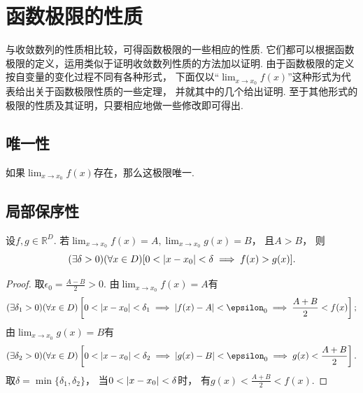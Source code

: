 \section{函数极限的性质}
与收敛数列的性质相比较，可得函数极限的一些相应的性质.
它们都可以根据函数极限的定义，运用类似于证明收敛数列性质的方法加以证明.
由于函数极限的定义按自变量的变化过程不同有各种形式，
下面仅以“\(\lim_{x \to x_0}f(x)\)”这种形式为代表给出关于函数极限性质的一些定理，
并就其中的几个给出证明.
至于其他形式的极限的性质及其证明，只要相应地做一些修改即可得出.

\subsection{唯一性}
\begin{theorem}[唯一性]\label{theorem:极限.函数极限的唯一性}
如果\(\lim_{x \to x_0} f(x)\)存在，那么这极限唯一.
\end{theorem}

\subsection{局部保序性}
\begin{theorem}[局部保序性]\label{theorem:极限.函数极限的局部保序性1}
设\(f,g\in\mathbb{R}^D\).
若\(\lim_{x\to x_0} f(x) = A,
\lim_{x\to x_0} g(x) = B\)，
且\(A>B\)，
则\begin{equation*}
	(\exists\delta>0)
	(\forall x\in D)
	[0<\abs{x-x_0}<\delta \implies f(x)>g(x)].
\end{equation*}
\begin{proof}
取\(\epsilon_0=\frac{A-B}2>0\).
由\(\lim_{x\to x_0} f(x) = A\)有\begin{equation*}
	(\exists\delta_1>0)
	(\forall x\in D)
	\left[
		0<\abs{x - x_0}<\delta_1
		\implies
		\abs{f(x) - A}<\epsilon_0
		\implies
		\frac{A+B}2 < f(x)
	\right];
\end{equation*}
由\(\lim_{x\to x_0} g(x) = B\)有\begin{equation*}
	(\exists\delta_2>0)
	(\forall x\in D)
	\left[
		0<\abs{x - x_0}<\delta_2
		\implies
		\abs{g(x) - B}<\epsilon_0
		\implies
		g(x) < \frac{A+B}2
	\right].
\end{equation*}
取\(\delta=\min\{\delta_1,\delta_2\}\)，
当\(0<\abs{x-x_0}<\delta\)时，
有\(g(x) < \frac{A+B}2 < f(x)\).
\end{proof}
\end{theorem}

